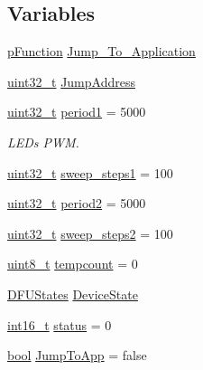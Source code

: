 \subsection*{Variables}
\begin{DoxyCompactItemize}
\item 
\hyperlink{group___revolution_b_l_ga9227bf1f1a9c633a0cc9ca50cc761c1a}{p\-Function} \hyperlink{group___revolution_b_l_gafe6990204003a7b416139a4723064b14}{Jump\-\_\-\-To\-\_\-\-Application}
\item 
\hyperlink{stdint_8h_a435d1572bf3f880d55459d9805097f62}{uint32\-\_\-t} \hyperlink{group___revolution_b_l_ga77170d6dd28c130d54753378bdfa035e}{Jump\-Address}
\item 
\hyperlink{stdint_8h_a435d1572bf3f880d55459d9805097f62}{uint32\-\_\-t} \hyperlink{group___revolution_b_l_gabe751b3d399e053031c1e3db20b6b071}{period1} = 5000
\begin{DoxyCompactList}\small\item\em L\-E\-Ds P\-W\-M. \end{DoxyCompactList}\item 
\hyperlink{stdint_8h_a435d1572bf3f880d55459d9805097f62}{uint32\-\_\-t} \hyperlink{group___revolution_b_l_ga594b91aa3e135c58969dc298b8acdeb3}{sweep\-\_\-steps1} = 100
\item 
\hyperlink{stdint_8h_a435d1572bf3f880d55459d9805097f62}{uint32\-\_\-t} \hyperlink{group___revolution_b_l_gadf8633b43922fbf4f1d86981daf74ccc}{period2} = 5000
\item 
\hyperlink{stdint_8h_a435d1572bf3f880d55459d9805097f62}{uint32\-\_\-t} \hyperlink{group___revolution_b_l_gac9cf28c40cee906b9405cb32f16b1fa2}{sweep\-\_\-steps2} = 100
\item 
\hyperlink{stdint_8h_aba7bc1797add20fe3efdf37ced1182c5}{uint8\-\_\-t} \hyperlink{group___revolution_b_l_ga61692259c50bf6def0bc56b1c2fd44b8}{tempcount} = 0
\item 
\hyperlink{group___copter_control_b_l_ga9a9e510f2da4e725074c7191d9d75d37}{D\-F\-U\-States} \hyperlink{group___revolution_b_l_ga342208ed1954c6486eac389edf7c7f86}{Device\-State}
\item 
\hyperlink{stdint_8h_aa343fa3b3d06292b959ffdd4c4703b06}{int16\-\_\-t} \hyperlink{group___revolution_b_l_ga2414697de79a243562514a0a4344a4dd}{status} = 0
\item 
\hyperlink{group___exported__types_gaf6a258d8f3ee5206d682d799316314b1}{bool} \hyperlink{group___revolution_b_l_ga31be3333eed4c575309bd493c4f42676}{Jump\-To\-App} = false
\item 

\end{DoxyCompactItemize}
